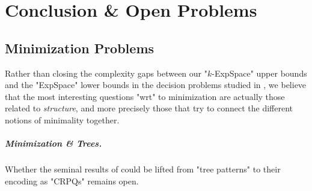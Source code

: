 \chapter[Conclusion \&~Open Problems]{Conclusion \& Open Problems}
\label{ch:conclu-database}
\renewcommand\thefigure{\thechapter.\arabic{figure}}

\begin{chapterpresentation}
	\begin{abstract}
		We conclude the first part of the thesis on graph databases.
		We recall the most interesting open problems and conjectures
		on minimization that we discussed in the previous chapters.
		We conclude by presenting the notion of "profinite databases":
		we briefly explain that while the notion does seem promising 
		to help understand the structure of "CRPQs", we unfortunately
		failed to use it in an interesting manner.
	\end{abstract}
		
	\par\bigskip\bigskip
	\chaptertoc
\end{chapterpresentation}

\section{Minimization Problems}

Rather than closing the complexity gaps between our "$k$-ExpSpace" upper bounds
and the "ExpSpace" lower bounds in the decision problems
studied in ,
we believe that the most interesting questions "wrt" to minimization
are actually those related to \emph{structure}, and more precisely those that try to
connect the different notions of minimality together.

\conjAtomVariableMinimal*

\paragraph*{Minimization \& Trees.}
Whether the seminal results of \cite{CzerwinskiMartensNiewerthParys2018Minimization} could be lifted from "tree patterns" to their encoding as "CRPQs" remains open.
\conjTreePatternsAsCRPQs*

